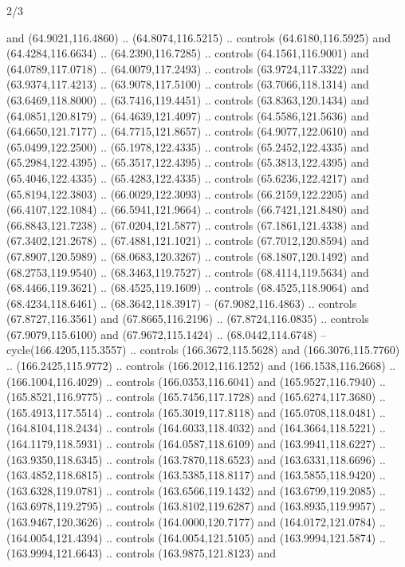 \begin{flagdescription}{2/3}
\begin{scope}[shift={(0.5\flaglength,0.5)},scale=\flagwidth/320]
\begin{scope}[y=0.8pt, x=0.8pt, yscale=-1,shift={(-118.3,-146)}]
  and (64.9021,116.4860) .. (64.8074,116.5215) .. controls (64.6180,116.5925)
  and (64.4284,116.6634) .. (64.2390,116.7285) .. controls (64.1561,116.9001)
  and (64.0789,117.0718) .. (64.0079,117.2493) .. controls (63.9724,117.3322)
  and (63.9374,117.4213) .. (63.9078,117.5100) .. controls (63.7066,118.1314)
  and (63.6469,118.8000) .. (63.7416,119.4451) .. controls (63.8363,120.1434)
  and (64.0851,120.8179) .. (64.4639,121.4097) .. controls (64.5586,121.5636)
  and (64.6650,121.7177) .. (64.7715,121.8657) .. controls (64.9077,122.0610)
  and (65.0499,122.2500) .. (65.1978,122.4335) .. controls (65.2452,122.4335)
  and (65.2984,122.4395) .. (65.3517,122.4395) .. controls (65.3813,122.4395)
  and (65.4046,122.4335) .. (65.4283,122.4335) .. controls (65.6236,122.4217)
  and (65.8194,122.3803) .. (66.0029,122.3093) .. controls (66.2159,122.2205)
  and (66.4107,122.1084) .. (66.5941,121.9664) .. controls (66.7421,121.8480)
  and (66.8843,121.7238) .. (67.0204,121.5877) .. controls (67.1861,121.4338)
  and (67.3402,121.2678) .. (67.4881,121.1021) .. controls (67.7012,120.8594)
  and (67.8907,120.5989) .. (68.0683,120.3267) .. controls (68.1807,120.1492)
  and (68.2753,119.9540) .. (68.3463,119.7527) .. controls (68.4114,119.5634)
  and (68.4466,119.3621) .. (68.4525,119.1609) .. controls (68.4525,118.9064)
  and (68.4234,118.6461) .. (68.3642,118.3917) -- (67.9082,116.4863) .. controls
  (67.8727,116.3561) and (67.8665,116.2196) .. (67.8724,116.0835) .. controls
  (67.9079,115.6100) and (67.9672,115.1424) .. (68.0442,114.6748) --
  cycle(166.4205,115.3557) .. controls (166.3672,115.5628) and
  (166.3076,115.7760) .. (166.2425,115.9772) .. controls (166.2012,116.1252) and
  (166.1538,116.2668) .. (166.1004,116.4029) .. controls (166.0353,116.6041) and
  (165.9527,116.7940) .. (165.8521,116.9775) .. controls (165.7456,117.1728) and
  (165.6274,117.3680) .. (165.4913,117.5514) .. controls (165.3019,117.8118) and
  (165.0708,118.0481) .. (164.8104,118.2434) .. controls (164.6033,118.4032) and
  (164.3664,118.5221) .. (164.1179,118.5931) .. controls (164.0587,118.6109) and
  (163.9941,118.6227) .. (163.9350,118.6345) .. controls (163.7870,118.6523) and
  (163.6331,118.6696) .. (163.4852,118.6815) .. controls (163.5385,118.8117) and
  (163.5855,118.9420) .. (163.6328,119.0781) .. controls (163.6566,119.1432) and
  (163.6799,119.2085) .. (163.6978,119.2795) .. controls (163.8102,119.6287) and
  (163.8935,119.9957) .. (163.9467,120.3626) .. controls (164.0000,120.7177) and
  (164.0172,121.0784) .. (164.0054,121.4394) .. controls (164.0054,121.5105) and
  (163.9994,121.5874) .. (163.9994,121.6643) .. controls (163.9875,121.8123) and

\end{scope}
\end{scope}
\end{flagdescription}
